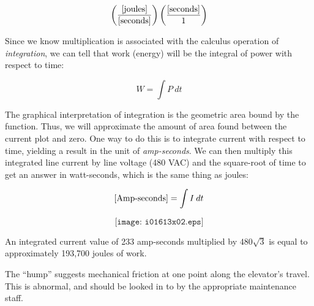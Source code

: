 $$\left( {[\hbox{joules}] \over [\hbox{seconds}]} \right) \left( {[\hbox{seconds}] \over 1} \right)$$

Since we know multiplication is associated with the calculus operation of {\it integration}, we can tell that work (energy) will be the integral of power with respect to time:

$$W = \int P \> dt$$

The graphical interpretation of integration is the geometric area bound by the function.  Thus, we will approximate the amount of area found between the current plot and zero.  One way to do this is to integrate current with respect to time, yielding a result in the unit of {\it amp-seconds}.  We can then multiply this integrated line current by line voltage (480 VAC) and the square-root of time to get an answer in watt-seconds, which is the same thing as joules:

$$[\hbox{Amp-seconds}] = \int I \> dt$$

$$\texttt{[image: i01613x02.eps]}$$

An integrated current value of 233 amp-seconds multiplied by $480 \sqrt{3}$ is equal to approximately 193,700 joules of work.

\vskip 10pt

The ``hump'' suggests mechanical friction at one point along the elevator's travel.  This is abnormal, and should be looked in to by the appropriate maintenance staff.




